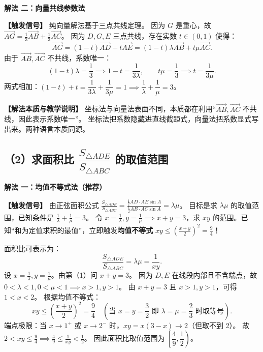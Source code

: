 \documentclass[11pt,a4paper,fontset=fandol]{ctexart}
\newcommand{\vect}[1]{\overrightarrow{#1}}
\newcommand{\ans}[1]{\boxed{#1}}
\newcommand{\method}[1]{\par\medskip\noindent\textbf{解法 #1}\par}
\begin{document}
\method{二：向量共线参数法}

\noindent\textbf{【触发信号】}
纯向量解法基于三点共线定理。
因为 $G$ 是重心，故 $\vect{AG} = \frac{1}{3}\vect{AB} + \frac{1}{3}\vect{AC}$。
因为 $D, G, E$ 三点共线，存在实数 $t \in (0,1)$ 使得：
\[
\vect{AG} = (1-t)\vect{AD} + t\vect{AE} = (1-t)\lambda\vect{AB} + t\mu\vect{AC}.
\]
由于 $\vect{AB}, \vect{AC}$ 不共线，系数唯一：
\[
(1-t)\lambda = \frac{1}{3} \implies 1-t = \frac{1}{3\lambda}, \qquad t\mu = \frac{1}{3} \implies t = \frac{1}{3\mu}.
\]
两式相加：$(1-t) + t = \dfrac{1}{3\lambda} + \dfrac{1}{3\mu} = 1 \implies \dfrac{1}{\lambda} + \dfrac{1}{\mu} = 3$。

\begin{note}
\textbf{【解法本质与教学说明】}
坐标法与向量法表面不同，本质都在利用“$\vect{AB}, \vect{AC}$ 不共线，因此表示系数唯一”。
坐标法把系数隐藏进直线截距式，向量法把系数显式写出来。两种语言本质同源。
\end{note}

\subsection*{（2）求面积比 $\dfrac{S_{\triangle ADE}}{S_{\triangle ABC}}$ 的取值范围}

\method{一：均值不等式法（推荐）}

\noindent\textbf{【触发信号】}
由正弦面积公式 \(\frac{S_{\triangle ADE}}{S_{\triangle ABC}} = \frac{\frac{1}{2}AD \cdot AE \sin A}{\frac{1}{2}AB \cdot AC \sin A} = \lambda\mu\)。
目标是求 \(\lambda\mu\) 的取值范围，已知条件是 \(\frac{1}{\lambda} + \frac{1}{\mu} = 3\)。
令 $x = \frac{1}{\lambda}, y = \frac{1}{\mu} \implies x+y=3$，求 $xy$ 的范围。已知“和为定值求积的最值”，立即触发\textbf{均值不等式} $xy \le \left(\frac{x+y}{2}\right)^2 = \frac{9}{4}$！

面积比可表示为：
\[
\frac{S_{\triangle ADE}}{S_{\triangle ABC}} = \lambda\mu = \frac{1}{xy}.
\]
设 $x = \frac{1}{\lambda}, y = \frac{1}{\mu}$。由第（1）问 $x + y = 3$。
因为 $D, E$ 在线段内部且不含端点，故 $0 < \lambda < 1, 0 < \mu < 1 \implies x > 1, y > 1$。
由 $x + y = 3$ 且 $x > 1, y > 1$，可得 $1 < x < 2$。
根据均值不等式：
\[
xy \le \left(\frac{x+y}{2}\right)^2 = \frac{9}{4} \quad (\text{当 } x = y = \frac{3}{2} \text{ 即 } \lambda = \mu = \frac{2}{3} \text{ 时取等号}).
\]
端点极限：当 $x \to 1^+$ 或 $x \to 2^-$ 时，$xy = x(3-x) \to 2$（但取不到 2）。
故 $2 < xy \le \frac{9}{4} \implies \frac{4}{9} \le \frac{1}{xy} < \frac{1}{2}$。
因此面积比取值范围为 \(\ans{\left[\dfrac{4}{9}, \dfrac{1}{2}\right)}\)。
\end{document}
